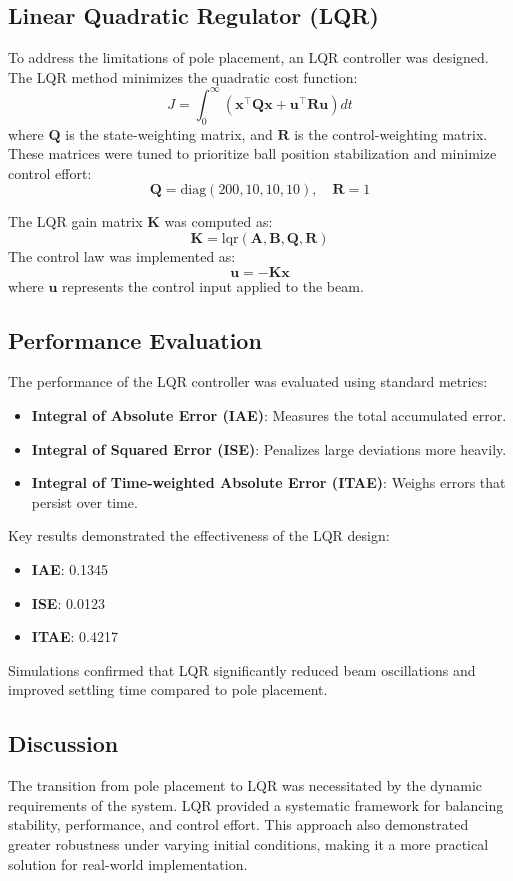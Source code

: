 \documentclass[conference]{IEEEtran}
\begin{document}
\subsection{Linear Quadratic Regulator (LQR)}
\label{subsec:control_lqr}
To address the limitations of pole placement, an LQR controller was designed. The LQR method minimizes the quadratic cost function:
\[
J = \int_0^\infty \left( \mathbf{x}^\top \mathbf{Q} \mathbf{x} + \mathbf{u}^\top \mathbf{R} \mathbf{u} \right) dt
\]
where \(\mathbf{Q}\) is the state-weighting matrix, and \(\mathbf{R}\) is the control-weighting matrix. These matrices were tuned to prioritize ball position stabilization and minimize control effort:
\[
\mathbf{Q} = \text{diag}(200, 10, 10, 10), \quad \mathbf{R} = 1
\]

The LQR gain matrix \(\mathbf{K}\) was computed as:
\[
\mathbf{K} = \text{lqr}(\mathbf{A}, \mathbf{B}, \mathbf{Q}, \mathbf{R})
\]
The control law was implemented as:
\[
\mathbf{u} = -\mathbf{K} \mathbf{x}
\]
where \(\mathbf{u}\) represents the control input applied to the beam.

\subsection{Performance Evaluation}
\label{control_performance}
The performance of the LQR controller was evaluated using standard metrics:
\begin{itemize}
    \item \textbf{Integral of Absolute Error (IAE)}: Measures the total accumulated error.
    \item \textbf{Integral of Squared Error (ISE)}: Penalizes large deviations more heavily.
    \item \textbf{Integral of Time-weighted Absolute Error (ITAE)}: Weighs errors that persist over time.
\end{itemize}

Key results demonstrated the effectiveness of the LQR design:
\begin{itemize}
    \item \textbf{IAE}: 0.1345
    \item \textbf{ISE}: 0.0123
    \item \textbf{ITAE}: 0.4217
\end{itemize}
Simulations confirmed that LQR significantly reduced beam oscillations and improved settling time compared to pole placement.

\subsection{Discussion}
\label{control_discuss}
The transition from pole placement to LQR was necessitated by the dynamic requirements of the system. LQR provided a systematic framework for balancing stability, performance, and control effort. This approach also demonstrated greater robustness under varying initial conditions, making it a more practical solution for real-world implementation.
\end{document}

